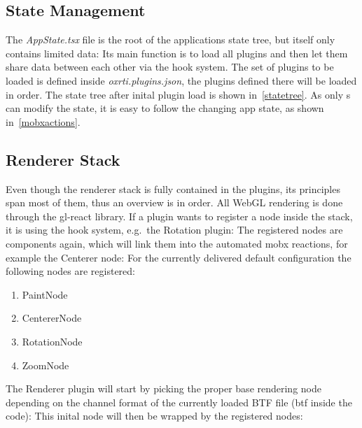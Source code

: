 \subsection{State Management}\label{sec_state}
The \emph{AppState.tsx} file is the root of the applications state tree, but
itself only contains limited data:
Its main function is to load all plugins and then let them share data between
each other via the hook system. The set of plugins to be loaded is defined inside
\emph{oxrti.plugins.json}, the plugins defined there will be loaded in order.
The state tree after inital plugin load is shown in~\autoref{statetree}.
As only s can modify the state, it is easy to follow the changing
app state, as shown in~\autoref{mobxactions}.

\subsection{Renderer Stack}\label{sec_rendererstack}
Even though the renderer stack is fully contained in the plugins, its principles
span most of them, thus an overview is in order. All WebGL rendering is done
through the gl-react library. If a plugin wants to register a node inside the
stack, it is using the hook system, e.g.\ the Rotation plugin:
The registered nodes are components again, which will link them into the
automated mobx reactions, for example the Centerer node:
For the currently delivered default configuration the following nodes are
registered:
\begin{enumerate}
\item PaintNode
\item CentererNode
\item RotationNode
\item ZoomNode
\end{enumerate}
The Renderer plugin will start by picking the proper base rendering node
depending on the channel format of the currently loaded BTF file (btf inside the
code):
This inital node will then be wrapped by the registered nodes:

